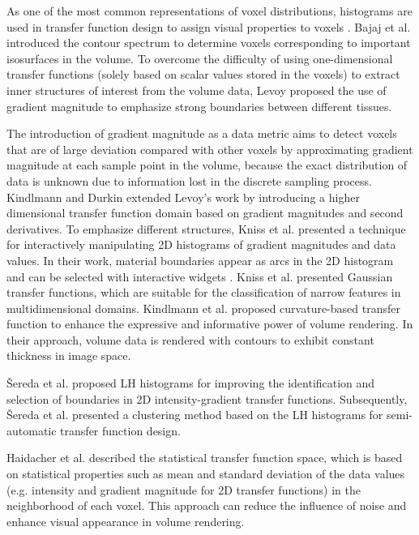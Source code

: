 As one of the most common representations of voxel distributions, histograms are used in transfer function design to assign visual properties to voxels \cite{pfister_transfer_2001}. Bajaj et al. \cite{bajaj_contour_1997} introduced the contour spectrum to determine voxels corresponding to important isosurfaces in the volume. To overcome the difficulty of using one-dimensional transfer functions (solely based on scalar values stored in the voxels) to extract inner structures of interest from the volume data, Levoy \cite{levoy_display_1988} proposed the use of gradient magnitude to emphasize strong boundaries between different tissues.

The introduction of gradient magnitude as a data metric aims to detect voxels that are of large deviation compared with other voxels by approximating gradient magnitude at each sample point in the volume, because the exact distribution of data is unknown due to information lost in the discrete sampling process.
Kindlmann and Durkin \cite{kindlmann_semi-automatic_1998} extended Levoy's work \cite{levoy_display_1988} by introducing a higher dimensional transfer function domain based on gradient magnitudes and second derivatives. To emphasize different structures, Kniss et al. \cite{kniss_interactive_2001} presented a technique for interactively manipulating 2D histograms of gradient magnitudes and data values. In their work, material boundaries appear as arcs in the 2D histogram and can be selected with interactive widgets \cite{kniss_multidimensional_2002}.
Kniss et al. \cite{kniss_gaussian_2003} presented Gaussian transfer functions, which are suitable for the classification of narrow features in multidimensional domains.
Kindlmann et al. \cite{kindlmann_curvature-based_2003} proposed curvature-based transfer function to enhance the expressive and informative power of volume rendering. In their approach, volume data is rendered with contours to exhibit constant thickness in image space.

{\v S}ereda et al. \cite{sereda_visualization_2006} proposed LH histograms for improving the identification and selection of boundaries in 2D intensity-gradient transfer functions. Subsequently, {\v S}ereda et al. \cite{sereda_automating_2006} presented a clustering method based on the LH histograms for semi-automatic transfer function design.

Haidacher et al. \cite{haidacher_volume_2010} described the statistical transfer function space, which is based on statistical properties such as mean and standard deviation of the data values (e.g. intensity and gradient magnitude for 2D transfer functions) in the neighborhood of each voxel. This approach can reduce the influence of noise and enhance visual appearance in volume rendering.

